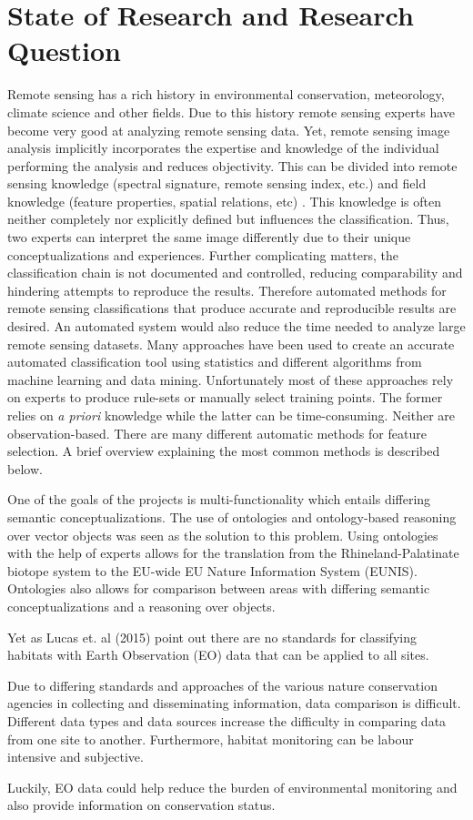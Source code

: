 \section{State of Research and Research Question}
Remote sensing has a rich history in environmental conservation, meteorology,
climate science and other fields. Due to this history remote sensing experts
have become very good at analyzing remote sensing data. Yet, remote sensing
image analysis implicitly incorporates the expertise and knowledge of the
individual performing the analysis and reduces objectivity. This can be divided
into remote sensing knowledge (spectral signature, remote sensing index, etc.)
and field knowledge (feature properties, spatial relations, etc)
\citep{Andres2013a}. This knowledge is often neither completely nor explicitly
defined but influences the classification. Thus, two experts can interpret the
same image differently due to their unique conceptualizations and experiences.
Further complicating matters, the classification chain is not documented and
controlled, reducing comparability and hindering attempts to reproduce the
results\citep{Arvor2013}. Therefore automated methods for remote sensing
classifications that produce accurate and reproducible results are desired.
An automated system would also reduce the time needed to analyze large
remote sensing datasets. Many approaches have been used to create an accurate
automated classification tool using statistics and different algorithms
from machine learning and data mining. Unfortunately most of these approaches
rely on experts to produce rule-sets or manually select training points. The
former relies on \emph{a priori} knowledge while the latter can be
time-consuming.
Neither are observation-based. There are many different automatic methods
for feature selection. A brief overview explaining the most common methods is
described below.


One of the goals of the projects is
multi-functionality which entails differing semantic conceptualizations. The use
of ontologies and ontology-based reasoning over vector objects was seen as the
solution to this problem. Using ontologies with the help of experts allows for
the translation from the Rhineland-Palatinate biotope system to the EU-wide EU
Nature Information System (EUNIS). Ontologies also allows
for comparison between areas with differing semantic conceptualizations and a
reasoning over objects. 

Yet as Lucas et. al (2015) point out there are no standards for classifying
habitats with Earth Observation (EO) data that can be applied to all sites. 

Due to differing standards and approaches of the various nature conservation
agencies in collecting and disseminating information, data comparison is
difficult. Different data types and data sources increase the difficulty in
comparing data from one site to another. Furthermore, habitat monitoring can
be labour intensive and subjective.

Luckily, EO data could help reduce the burden of environmental monitoring and
also provide information on conservation status.
